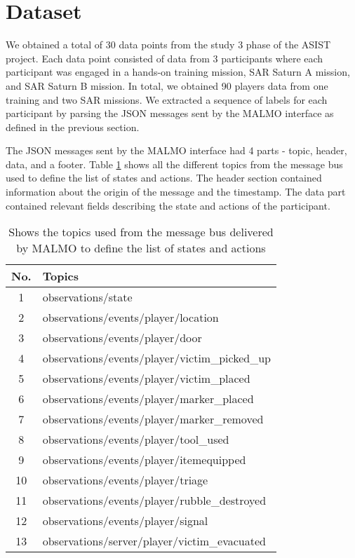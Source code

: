 \documentclass{article}
\begin{document}
\section*{Dataset}
We obtained a total of 30 data points from the study 3 phase of the ASIST project.
Each data point consisted of data from 3 participants where each participant was engaged in a hands-on training mission, SAR Saturn A mission, and SAR Saturn B mission. In total, we obtained 90 players data from one training and two SAR missions. We extracted a sequence of labels for each participant by parsing the JSON messages sent by the MALMO interface as defined in the previous section.

The JSON messages sent by the MALMO interface had 4 parts - topic, header, data, and a footer. Table \ref{table:2} shows all the different topics from the message bus used to define the list of states and actions. The header section contained information about the origin of the message and the timestamp. The data part contained relevant fields describing the state and actions of the participant.

\begin{table}[h!]
    \centering
    \begin{tabular}{|c|l|}
    \hline
    No. & \textbf{Topics} \\[1em]
    \hline
    1 & observations/state \\[0.5em]
    2 & observations/events/player/location \\[0.5em]
    3 & observations/events/player/door \\[0.5em]
    4 & observations/events/player/victim\_picked\_up \\[0.5em]
    5 & observations/events/player/victim\_placed \\[0.5em]
    6 & observations/events/player/marker\_placed \\[0.5em]
    7 & observations/events/player/marker\_removed \\[0.5em]
    8 & observations/events/player/tool\_used \\[0.5em]
    9 & observations/events/player/itemequipped \\[0.5em]
    10 & observations/events/player/triage \\[0.5em] 
    11 & observations/events/player/rubble\_destroyed \\[0.5em]
    12 & observations/events/player/signal \\[0.5em]
    13 & observations/server/player/victim\_evacuated \\[0.5em]
    \hline
    \end{tabular}
    \caption{Shows the topics used from the message bus delivered by MALMO 
    to define the list of states and actions}
    \label{table:2}
\end{table}
\end{document}
